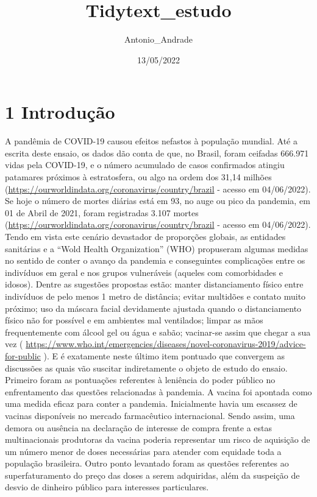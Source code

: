 \documentclass[
]{article}
\title{Tidytext\_estudo}
\author{Antonio\_Andrade}
\date{13/05/2022}
\begin{document}
\maketitle

\hypertarget{introduuxe7uxe3o}{%
\section{1 Introdução}\label{introduuxe7uxe3o}}

A pandêmia de COVID-19 causou efeitos nefastos à população mundial. Até
a escrita deste ensaio, os dados dão conta de que, no Brasil, foram
ceifadas 666.971 vidas pela COVID-19, e o número acumulado de casos
confirmados atingiu patamares próximos à estratosfera, ou algo na ordem
dos 31,14 milhões
(\url{https://ourworldindata.org/coronavirus/country/brazil} - acesso em
04/06/2022). Se hoje o número de mortes diárias está em 93, no auge ou
pico da pandemia, em 01 de Abril de 2021, foram registradas 3.107 mortes
(\url{https://ourworldindata.org/coronavirus/country/brazil} - acesso em
04/06/2022). Tendo em vista este cenário devastador de proporções
globais, as entidades sanitárias e a ``Wold Health Organization'' (WHO)
propuseram algumas medidas no sentido de conter o avanço da pandemia e
conseguintes complicações entre os indivíduos em geral e nos grupos
vulneráveis (aqueles com comorbidades e idosos). Dentre as sugestões
propostas estão: manter distanciamento físico entre indivíduos de pelo
menos 1 metro de distância; evitar multidões e contato muito próximo;
uso da máscara facial devidamente ajustada quando o distanciamento
físico não for possível e em ambientes mal ventilados; limpar as mãos
frequentemente com álcool gel ou água e sabão; vacinar-se assim que
chegar a sua vez (
\url{https://www.who.int/emergencies/diseases/novel-coronavirus-2019/advice-for-public}
). E é exatamente neste último item pontuado que convergem as discussões
as quais vão suscitar indiretamente o objeto de estudo do ensaio.
Primeiro foram as pontuações referentes à leniência do poder público no
enfrentamento das questões relacionadas à pandemia. A vacina foi
apontada como uma medida eficaz para conter a pandemia. Inicialmente
havia um escassez de vacinas disponíveis no mercado farmacêutico
internacional. Sendo assim, uma demora ou ausência na declaração de
interesse de compra frente a estas multinacionais produtoras da vacina
poderia representar um risco de aquisição de um número menor de doses
necessárias para atender com equidade toda a população brasileira. Outro
ponto levantado foram as questões referentes ao superfaturamento do
preço das doses a serem adquiridas, além da suspeição de desvio de
dinheiro público para interesses particulares.
\end{document}
